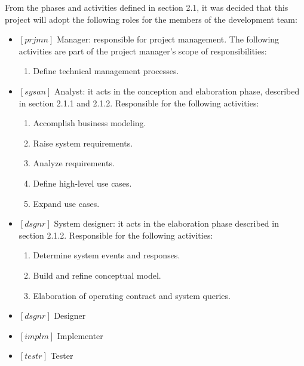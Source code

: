 \documentclass[11pt, twoside, a4paper]{book}
\begin{document}
				From the phases and activities defined in section 2.1, it was decided that this project will adopt the following roles for the members of the development team:
        		
				\begin{itemize}
        		        			
        			\item $[prjmn]$ Manager: responsible for project management. The following activities are part of the project manager's scope of responsibilities:
        			
						\begin{enumerate}
							\item Define technical management processes.						
						\end{enumerate}					        			
        			
        			\item $[sysan]$ Analyst: it acts in the conception and elaboration phase, described in section 2.1.1 and 2.1.2. Responsible for the following activities:
        				\begin{enumerate}
        					\item Accomplish business modeling.
        					\item Raise system requirements.
        					\item Analyze requirements.
        					\item Define high-level use cases.
        					\item Expand use cases.
        				\end{enumerate}
        		
        			\item $[dsgnr]$ System designer: it acts in the elaboration phase described in section 2.1.2. Responsible for the following activities:
        				\begin{enumerate}
        					\item Determine system events and responses.
        					\item Build and refine conceptual model.
        					\item Elaboration of operating contract and system queries.
        				\end{enumerate}
        			
        			\item $[dsgnr]$ Designer
        			
        			\item $[implm]$ Implementer
        			
        			\item $[testr]$ Tester
        			
				\end{itemize}
				       		
\end{document}
